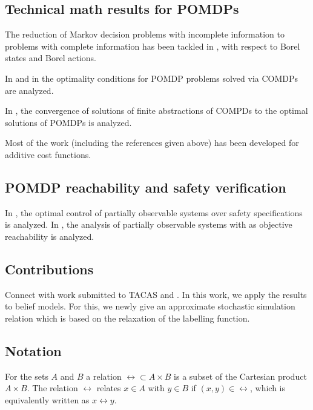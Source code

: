 \documentclass{ifacconf}
\newcommand{\red}[1]{{\color{red} #1}}
\begin{document}
\subsection{Technical math results for POMDPs}
The reduction of Markov decision problems with incomplete information to problems with complete information has been tackled in
\cite{yushkevich_reduction_1976,rhenius_incomplete_1974}, with respect to Borel states and Borel actions.

In \cite{feinberg2016partially} and in \cite{feinberg2014optimality} the optimality conditions for POMDP problems solved via COMDPs are analyzed. 

In \cite{saldi2017finite}, the convergence of solutions of finite abstractions of COMPDs to the optimal solutions of POMDPs is analyzed. 


Most of the work (including the references given above) has been developed for additive cost functions. 


\subsection{POMDP reachability and safety verification}


In \cite{ding2013optimal}, the optimal control of partially observable systems over safety specifications is analyzed. 
In \cite{LESSER20141989}, the analysis of partially observable systems with as objective reachability is analyzed. 

\subsection{Contributions}
\red{Connect with work submitted to TACAS \citep{tech_report_TACAS} and \citep{haesaert2017verification}.  }
In this work, we apply the results to belief models. For this,  we newly give an approximate stochastic simulation relation which is based on the relaxation of the labelling function.
\subsection{Notation}

For the sets $A$ and $B$ a relation $\rel\subset A\times B$ is a subset of the Cartesian product $A\times B$. The relation $\rel$ relates $x\in A$ with $y\in B$ if $(x,y)\in\rel$, which is equivalently written as $x\rel y$.
\end{document}
